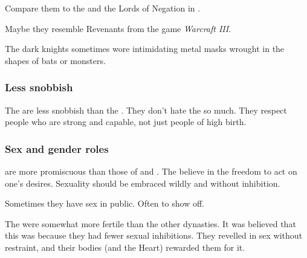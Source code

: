 Compare them to the  and the Lords of Negation in \FLuneNoire. 

Maybe they resemble Revenants from the game \emph{Warcraft III}. 

The dark knights sometimes wore intimidating metal masks wrought in the shapes of bats or monsters. 






\subsubsection{Less snobbish}
The \Mystraacht{} are less snobbish than the \KiriathSepher. 
They don't hate the \ashenblooded{} so much. 
They respect people who are strong and capable, not just people of high birth. 





\subsubsection{Sex and gender roles}
\Mystraacht{} \resviel{} are more promiscuous than those of \CiriathSepher{} and \TiphredSerah. 
The \Mystraacht{} believe in the freedom to act on one's desires. 
Sexuality should be embraced wildly and without inhibition. 

Sometimes they have sex in public. 
Often to show off. 

The \Mystraacht were somewhat more fertile than the other dynasties.
It was believed that this was because they had fewer sexual inhibitions.
They revelled in sex without restraint, and their bodies (and the Heart) rewarded them for it.

